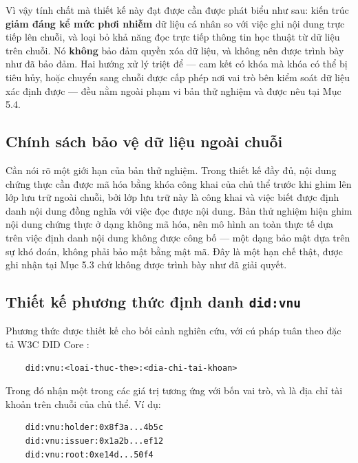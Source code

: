 Vì vậy tính chất mà thiết kế này đạt được cần được phát biểu như sau: kiến trúc \textbf{giảm đáng kể mức phơi nhiễm} dữ liệu cá nhân so với việc ghi nội dung trực tiếp lên chuỗi, và loại bỏ khả năng đọc trực tiếp thông tin học thuật từ dữ liệu trên chuỗi. Nó \textbf{không} bảo đảm quyền xóa dữ liệu, và không nên được trình bày như đã bảo đảm. Hai hướng xử lý triệt để --- cam kết có khóa mà khóa có thể bị tiêu hủy, hoặc chuyển sang chuỗi được cấp phép nơi vai trò bên kiểm soát dữ liệu xác định được --- đều nằm ngoài phạm vi bản thử nghiệm và được nêu tại Mục 5.4.

\subsection{Chính sách bảo vệ dữ liệu ngoài chuỗi}



Cần nói rõ một giới hạn của bản thử nghiệm. Trong thiết kế đầy đủ, nội dung chứng thực cần được mã hóa bằng khóa công khai của chủ thể trước khi ghim lên lớp lưu trữ ngoài chuỗi, bởi lớp lưu trữ này là công khai và việc biết được định danh nội dung đồng nghĩa với việc đọc được nội dung. Bản thử nghiệm hiện ghim nội dung chứng thực ở dạng không mã hóa, nên mô hình an toàn thực tế dựa trên việc định danh nội dung không được công bố --- một dạng bảo mật dựa trên sự khó đoán, không phải bảo mật bằng mật mã. Đây là một hạn chế thật, được ghi nhận tại Mục 5.3 chứ không được trình bày như đã giải quyết.

\subsection{Thiết kế phương thức định danh \texttt{did:vnu}}

Phương thức  được thiết kế cho bối cảnh nghiên cứu, với cú pháp tuân theo đặc tả W3C DID Core \cite{W3C_DIDCore2022}:

\begin{lstlisting}
    did:vnu:<loai-thuc-the>:<dia-chi-tai-khoan>
\end{lstlisting}

Trong đó  nhận một trong các giá trị tương ứng với bốn vai trò, và  là địa chỉ tài khoản trên chuỗi của chủ thể. Ví dụ:

\begin{lstlisting}
    did:vnu:holder:0x8f3a...4b5c
    did:vnu:issuer:0x1a2b...ef12
    did:vnu:root:0xe14d...50f4
\end{lstlisting}

